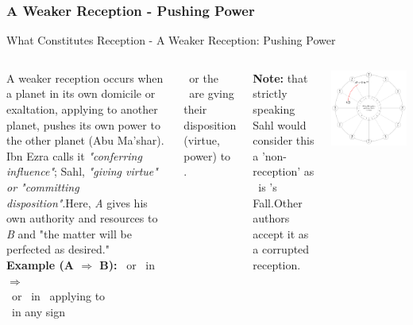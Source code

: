 \subsubsection{A Weaker Reception - Pushing Power}
\begin{frame}[t]{What Constitutes Reception - A Weaker Reception: Pushing Power}
\footnotesize
\begin{columns}[T, onlytextwidth]
A weaker reception occurs when a planet in its own domicile or exaltation, applying to another planet, pushes its own power  to the other planet (Abu Ma'shar). Ibn Ezra calls it \textsl{"conferring influence"}; Sahl, \textsl{"giving virtue" or "committing disposition"}.\footnotemark[1] Here, \textsl{A} gives his own authority and resources to \textsl{B} and "the matter will be perfected as desired." \\
\vspace{0.2cm}
\textbf{Example (A $\Rightarrow$ B):} \Mars\ or \Sun\ in \Aries\ $\Rightarrow$  \Saturn \\
\ul
\vspace{0.2cm}
\Mars\ or \Sun\ in \Aries\ applying to  \\
\Saturn\ in any sign

\vspace{0.25cm}
\Mars\ or the \Sun\ are gving their disposition (virtue, power) to \Saturn.

\vspace{0.25cm}
\textbf{Note:} that strictly speaking Sahl would consider this a 'non-reception' as \Aries\ is \Saturn's Fall.\footnotemark[2] Other authors accept it as a corrupted reception.

\begin{center}
{\includegraphics[width=\textwidth]{charts/01-weaker-reception}} \\
\end{center}


\end{columns}
\end{frame}
